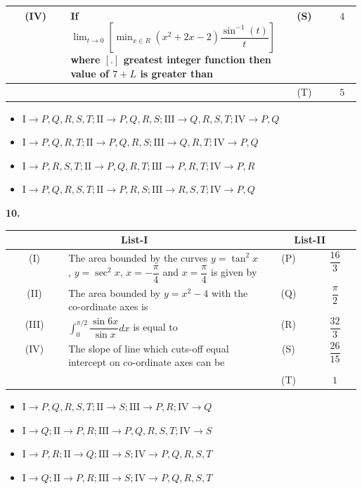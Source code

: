 \documentclass[10pt]{extarticle}
\newcommand{\qn}[1]{\par\smallskip\noindent\textbf{#1.}~}
\newenvironment{qoptions}{\begin{itemize}[leftmargin=1.8em,itemsep=1pt,topsep=2pt,label={}]}{\end{itemize}}
\newcommand{\opt}[2]{\item[(#1)] #2}
\begin{document}
\begin{multicols}{2}
{\begin{tabular}{|c|p{0.58\linewidth}|c|c|}
(IV) & If $\displaystyle\lim_{t\to0}\left[\min_{x\in R}\left(x^2+2x-2\right)\dfrac{\sin^{-1}(t)}t\right]$ where $[.]$ greatest integer function then value of $7+L$ is greater than & (S) & $4$\\ \hline
 & & (T) & $5$\\ \hline
\end{tabular}}\par
\begin{qoptions}
\opt{A}{$\mathrm I\to P,Q,R,S,T;\allowbreak \mathrm{II}\to P,Q,R,S;\allowbreak \mathrm{III}\to Q,R,S,T;\allowbreak \mathrm{IV}\to P,Q$}
\opt{B}{$\mathrm I\to P,Q,R,T;\allowbreak \mathrm{II}\to P,Q,R,S;\allowbreak \mathrm{III}\to Q,R,T;\allowbreak \mathrm{IV}\to P,Q$}
\opt{C}{$\mathrm I\to P,R,S,T;\allowbreak \mathrm{II}\to P,Q,R,T;\allowbreak \mathrm{III}\to P,R,T;\allowbreak \mathrm{IV}\to P,R$}
\opt{D}{$\mathrm I\to P,Q,R,S,T;\allowbreak \mathrm{II}\to P,R,S;\allowbreak \mathrm{III}\to R,S,T;\allowbreak \mathrm{IV}\to P,Q$}
\end{qoptions}
\qn{10}
{\small\setlength{\tabcolsep}{2pt}\begin{tabular}{|c|p{0.58\linewidth}|c|c|}
\hline
\multicolumn{2}{|c|}{\textbf{List-I}} & \multicolumn{2}{c|}{\textbf{List-II}}\\ \hline
(I) & The area bounded by the curves $y=\tan^2x$, $y=\sec^2x$, $x=-\dfrac\pi4$ and $x=\dfrac\pi4$ is given by & (P) & $\dfrac{16}3$\\ \hline
(II) & The area bounded by $y=x^2-4$ with the co-ordinate axes is & (Q) & $\dfrac\pi2$\\ \hline
(III) & $\displaystyle\int_0^{\pi/2}\dfrac{\sin6x}{\sin x}dx$ is equal to & (R) & $\dfrac{32}3$\\ \hline
(IV) & The slope of line which cuts-off equal intercept on co-ordinate axes can be & (S) & $\dfrac{26}{15}$\\ \hline
 & & (T) & $1$\\ \hline
\end{tabular}}\par
\begin{qoptions}
\opt{A}{$\mathrm I\to P,Q,R,S,T;\allowbreak \mathrm{II}\to S;\allowbreak \mathrm{III}\to P,R;\allowbreak \mathrm{IV}\to Q$}
\opt{B}{$\mathrm I\to Q;\allowbreak \mathrm{II}\to P,R;\allowbreak \mathrm{III}\to P,Q,R,S,T;\allowbreak \mathrm{IV}\to S$}
\opt{C}{$\mathrm I\to P,R;\allowbreak \mathrm{II}\to Q;\allowbreak \mathrm{III}\to S;\allowbreak \mathrm{IV}\to P,Q,R,S,T$}
\opt{D}{$\mathrm I\to Q;\allowbreak \mathrm{II}\to P,R;\allowbreak \mathrm{III}\to S;\allowbreak \mathrm{IV}\to P,Q,R,S,T$}

\end{qoptions}
\end{multicols}
\end{document}
